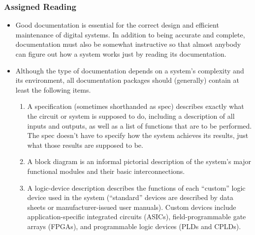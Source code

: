 \documentclass[10pt,a4paper]{article}
\begin{document}
\subsubsection{Assigned Reading}
\begin{itemize}
\item Good documentation is essential for the correct design and efficient maintenance of digital systems. In addition to being accurate and complete, documentation must also be somewhat instructive so that almost anybody can figure out how a system works just by reading its documentation.
\item Although the type of documentation depends on a system's complexity and its environment, all documentation packages should (generally) contain at least the following items.
\begin{enumerate}
\item A specification (sometimes shorthanded as spec) describes exactly what the circuit or system is supposed to do, including a description of all inputs and outputs, as well as a list of functions that are to be performed. The spec doesn't have to specify how the system achieves its results, just what those results are supposed to be. 
\item A block diagram is an informal pictorial description of the system's major functional modules and their basic interconnections.
\item A logic-device description describes the functions of each ``custom'' logic device used in the system (``standard'' devices are described by data sheets or manufacturer-issued user manuals). Custom devices include application-specific integrated circuits (ASICs), field-programmable gate arrays (FPGAs), and programmable logic devices (PLDs and CPLDs). 


\end{enumerate}
\end{itemize}
\end{document}

